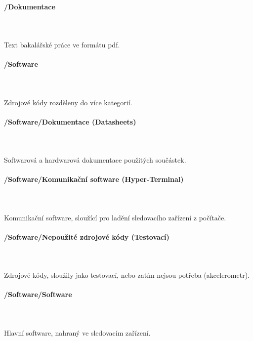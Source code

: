 \documentclass[FM,MP]{tulthesis}  %
\begin{document}
\paragraph{/Dokumentace}\mbox{}\\\mbox{}\\
Text bakalářské práce ve formátu pdf.

\paragraph{/Software}\mbox{}\\\mbox{}\\
Zdrojové kódy rozděleny do více kategorií.

\paragraph{/Software/Dokumentace (Datasheets)}\mbox{}\\\mbox{}\\
Softwarová a hardwarová dokumentace použitých součástek.

\paragraph{/Software/Komunikační software (Hyper-Terminal)}\mbox{}\\\mbox{}\\
Komunikační software, sloužící pro ladění sledovacího zařízení z počítače.

\paragraph{/Software/Nepoužité zdrojové kódy (Testovací)}\mbox{}\\\mbox{}\\
Zdrojové kódy, sloužily jako testovací, nebo zatím nejsou potřeba (akcelerometr).

\paragraph{/Software/Software}\mbox{}\\\mbox{}\\
Hlavní software, nahraný ve sledovacím zařízení.
\end{document}
